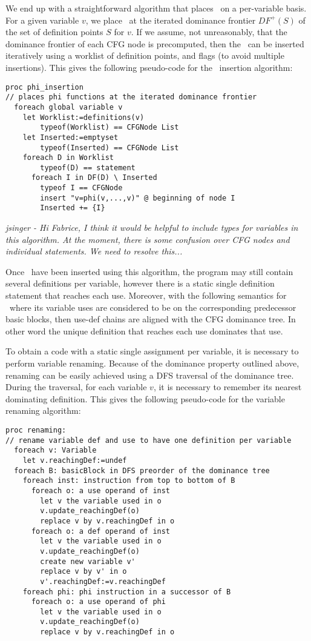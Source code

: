 {We end up with a straightforward algorithm that places \phiops\ on a per-variable basis.
For a given variable $v$, we place \phiops\ at the iterated dominance frontier $DF^{+}(S)$ of the set of definition points $S$ for $v$. 
If we assume, not unreasonably, that the dominance frontier of each CFG node is precomputed, then the \phiops\ can be inserted iteratively using a worklist of definition points, and flags (to avoid multiple insertions). 
This gives the following pseudo-code for the \phiop\ insertion algorithm:
\begin{verbatim}
proc phi_insertion
// places phi functions at the iterated dominance frontier
  foreach global variable v
    let Worklist:=definitions(v)
        typeof(Worklist) == CFGNode List
    let Inserted:=emptyset
        typeof(Inserted) == CFGNode List
    foreach D in Worklist
        typeof(D) == statement
      foreach I in DF(D) \ Inserted
        typeof I == CFGNode
        insert "v=phi(v,...,v)" @ beginning of node I
        Inserted += {I}
\end{verbatim}
\emph{jsinger - Hi Fabrice, I think it would be helpful to include
types for variables in this algorithm. At the moment, there is some confusion
over CFG nodes and individual statements. We need to resolve this...}

Once \phiops\ have been inserted using this algorithm, the program may still contain several definitions per variable, however there is a static single definition statement that reaches each use. Moreover, with the following semantics for \phiops\ where its variable uses are considered to be on the corresponding predecessor basic blocks, then use-def chains are aligned with the CFG dominance tree. In other word the unique definition that reaches each use dominates that use.

To obtain a code with a static single assignment per variable, it is necessary to perform variable renaming. Because of the dominance property outlined above,
renaming can be easily achieved using a DFS traversal of the dominance tree.
During the traversal, for each variable $v$, it is necessary to remember its nearest dominating definition.
This gives the following pseudo-code for the variable renaming algorithm:
\begin{verbatim}
proc renaming:
// rename variable def and use to have one definition per variable
  foreach v: Variable
    let v.reachingDef:=undef
  foreach B: basicBlock in DFS preorder of the dominance tree
    foreach inst: instruction from top to bottom of B
      foreach o: a use operand of inst
        let v the variable used in o
        v.update_reachingDef(o)
        replace v by v.reachingDef in o
      foreach o: a def operand of inst
        let v the variable used in o
        v.update_reachingDef(o)
        create new variable v'
        replace v by v' in o
        v'.reachingDef:=v.reachingDef
    foreach phi: phi instruction in a successor of B
      foreach o: a use operand of phi
        let v the variable used in o
        v.update_reachingDef(o)
        replace v by v.reachingDef in o
\end{verbatim}

}
